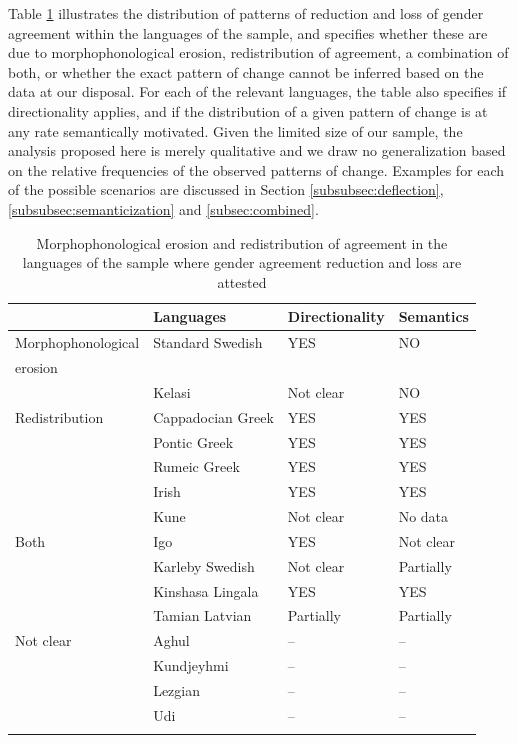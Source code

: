 \documentclass[output=collectionpaper]{langsci/langscibook}
\begin{document}
Table \ref{tab:2:defl} illustrates the distribution of patterns of reduction and loss of gender agreement within the languages of the sample, and specifies whether these are due to morphophonological erosion, redistribution of agreement, a combination of both, or whether the exact pattern of change cannot be inferred based on the data at our disposal. For each of the relevant languages, the table also specifies if directionality applies, and if the distribution of a given pattern of change is at any rate semantically motivated. Given the limited size of our sample, the analysis proposed here is merely qualitative and we draw no generalization based on the relative frequencies of the observed patterns of change. Examples for each of the possible scenarios are discussed in Section \ref{subsubsec:deflection}, \ref{subsubsec:semanticization} and \ref{subsec:combined}.


 \begin{table}[h!]
\caption{Morphophonological erosion and redistribution of agreement in the languages of the sample where gender agreement reduction and loss are attested}
\label{tab:2:defl}
\small
 \begin{tabular}{llll} %
  \lsptoprule
   & Languages & Directionality & Semantics \\ %
  \midrule
Morphophonological & Standard Swedish & YES & NO\\
erosion & &\\
& Kelasi & Not clear & NO \\ %
 \midrule
Redistribution & Cappadocian Greek   & YES & YES\\ %
 & Pontic Greek   & YES & YES\\ %
 & Rumeic Greek & YES  & YES\\ %
& Irish & YES  & YES\\ %
 & Kune & Not clear & No data\\ %
\midrule
Both & Igo  & YES & Not clear\\ %
& Karleby Swedish & Not clear & Partially \\
& Kinshasa Lingala  & YES & YES\\ %
& Tamian Latvian  & Partially & Partially\\ %
\midrule
Not clear & Aghul & -- & -- \\
& Kundjeyhmi  & --  &--\\ %
& Lezgian & -- & -- \\
& Udi &  -- & --\\ %
  \lspbottomrule
 \end{tabular}
 \end{table}
\end{document}
